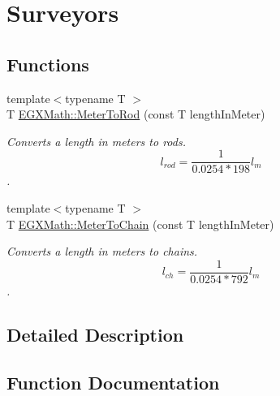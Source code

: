 \hypertarget{group___e_g_x_math-_conversions-_length_conversions-_s_i-_meter-_surveyors}{}\section{Surveyors}
\label{group___e_g_x_math-_conversions-_length_conversions-_s_i-_meter-_surveyors}
\subsection*{Functions}
\begin{DoxyCompactItemize}
\item 
{\footnotesize template$<$typename T $>$ }\\T \mbox{\hyperlink{group___e_g_x_math-_conversions-_length_conversions-_s_i-_meter-_surveyors_ga45c89e4e6dd1d1e3f2a6c4f4a1051543}{E\+G\+X\+Math\+::\+Meter\+To\+Rod}} (const T length\+In\+Meter)
\begin{DoxyCompactList}\small\item\em Converts a length in meters to rods. \[ l_{rod}= \frac{1}{0.0254 * 198} l_{m} \]. \end{DoxyCompactList}\item 
{\footnotesize template$<$typename T $>$ }\\T \mbox{\hyperlink{group___e_g_x_math-_conversions-_length_conversions-_s_i-_meter-_surveyors_ga67b4e6d6a387e3da5f93fd32b5d17764}{E\+G\+X\+Math\+::\+Meter\+To\+Chain}} (const T length\+In\+Meter)
\begin{DoxyCompactList}\small\item\em Converts a length in meters to chains. \[ l_{ch}= \frac{1}{0.0254 * 792} l_{m} \]. \end{DoxyCompactList}\end{DoxyCompactItemize}


\subsection{Detailed Description}


\subsection{Function Documentation}
\mbox{\label{group___e_g_x_math-_conversions-_length_conversions-_s_i-_meter-_surveyors_ga67b4e6d6a387e3da5f93fd32b5d17764}} 
